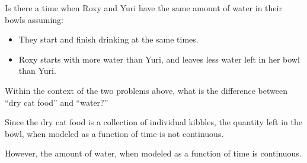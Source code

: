 \documentclass{ximera}
\begin{document}
\begin{problem}
  Is there a time when Roxy and Yuri have the same amount of water in
  their bowls assuming:
  \begin{itemize}
  \item They start and finish drinking at the same times.
  \item Roxy starts with more water than Yuri, and leaves less water
    left in her bowl than Yuri.
  \end{itemize}
    \begin{multipleChoice}
  \end{multipleChoice}
\end{problem}



\begin{problem}
  Within the context of the two problems above, what is the difference
  between ``dry cat food'' and ``water?''
  \begin{freeResponse}
    Since the dry cat food is a collection of individual kibbles, the
    quantity left in the bowl, when modeled as a function of time is
    not continuous.

    However, the amount of water, when modeled as a function of time
    is continuous. 
  \end{freeResponse}
\end{problem}


\end{document}
